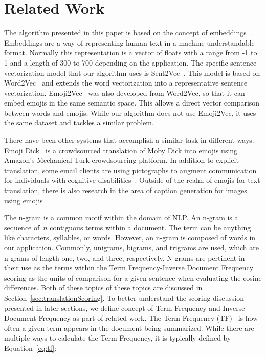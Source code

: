 \documentclass{article}[10]
\begin{document}
\section{Related Work}
The algorithm presented in this paper is based on the concept of embeddings~\cite{WhatAreW70}. Embeddings are a way of representing human text in a machine-understandable format. Normally this representation is a vector of floats with a range from -1 to 1 and a length of 300 to 700 depending on the application. The specific sentence vectorization model that our algorithm uses is Sent2Vec~\cite{pg2017unsu}. This model is based on Word2Vec~\cite{mikolov2013efficient} and extends the word vectorization into a representative sentence vectorization. Emoji2Vec~\cite{Eisner_2016} was also developed from Word2Vec, so that it can embed emojis in the same semantic space. This allows a direct vector comparison between words and emojis. While our algorithm does not use Emoji2Vec, it uses the same dataset and tackles a similar problem.

There have been other systems that accomplish a similar task in different ways. Emoji Dick~\cite{radford2016telephone} is a crowdsourced translation of Moby Dick into emojis using Amazon's Mechanical Turk crowdsourcing platform. In addition to explicit translation, some email clients are using pictographs to augment communication for individuals with cognitive disabilities~\cite{vandeghinste2017translating}. Outside of the realm of emojis for text translation, there is also research in the area of caption generation for images using emojis~\cite{mazoure-etal-2018-emojigan,cappallo2015image2emoji}

The n-gram is a common motif within the domain of NLP. An n-gram is a sequence of~\(n\) contiguous terms within a document. The term can be anything like characters, syllables, or words. However, an n-gram is composed of words in our application. Commonly, unigrams, bigrams, and trigrams are used, which are n-grams of length one, two, and three, respectively. N-grams are pertinent in their use as the terms within the Term Frequency-Inverse Document Frequency scoring as the units of comparison for a given sentence when evaluating the cosine differences. Both of these topics of these topics are discussed in Section~\ref{sec:translationScoring}. To better understand the scoring discussion presented in later sections, we define concept of Term Frequency and Inverse Document Frequency as part of related work. The Term Frequency (TF)~\cite{Leskovec} is how often a given term appears in the document being summarized. While there are multiple ways to calculate the Term Frequency, it is typically defined by Equation~\eqref{eq:tf}:
\end{document}

